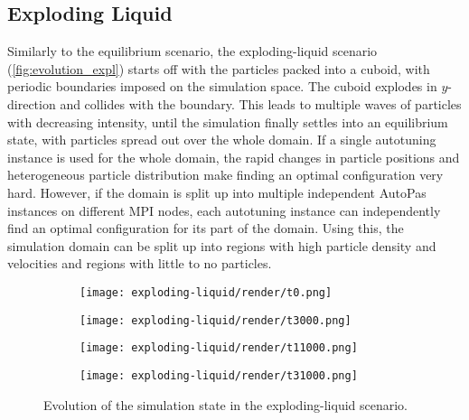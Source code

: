 \subsection{Exploding Liquid}
\label{subsec:scenario_expl}
Similarly to the equilibrium scenario, the exploding-liquid scenario (\autoref{fig:evolution_expl}) starts off with the particles packed into a cuboid, with periodic boundaries imposed on the simulation space. The cuboid explodes in $y$-direction and collides with the boundary. This leads to multiple waves of particles with decreasing intensity, until the simulation finally settles into an equilibrium state, with particles spread out over the whole domain. If a single autotuning instance is used for the whole domain, the rapid changes in particle positions and heterogeneous particle distribution make finding an optimal configuration very hard. However, if the domain is split up into multiple independent AutoPas instances on different MPI nodes, each autotuning instance can independently find an optimal configuration for its part of the domain. Using this, the simulation domain can be split up into regions with high particle density and velocities and regions with little to no particles.

\begin{figure}[htpb]
	\centering
	\begin{subfigure}[c]{.25\textwidth}
		\vspace*{-\ht\colorbarbox} %
		\texttt{[image: exploding-liquid/render/t0.png]}
	\end{subfigure}%
	\begin{subfigure}[c]{.25\textwidth}
		\texttt{[image: exploding-liquid/render/t3000.png]}
	\end{subfigure}%
	\begin{subfigure}[c]{.25\textwidth}
		\centering
		\texttt{[image: exploding-liquid/render/t11000.png]}
	\end{subfigure}%
	\begin{subfigure}[c]{.25\textwidth}
		\centering
		\texttt{[image: exploding-liquid/render/t31000.png]}
	\end{subfigure}
	\caption{Evolution of the simulation state in the exploding-liquid scenario.}
	\label{fig:evolution_expl}
\end{figure}

